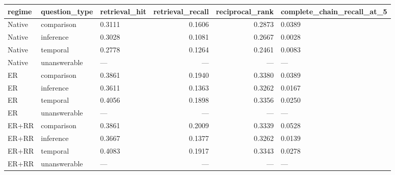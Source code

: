\begin{tabular}{lllrrl}
\toprule
regime & question_type & retrieval_hit & retrieval_recall & reciprocal_rank & complete_chain_recall_at_5 \\
\midrule
Native & comparison & 0.3111 & 0.1606 & 0.2873 & 0.0389 \\
Native & inference & 0.3028 & 0.1081 & 0.2667 & 0.0028 \\
Native & temporal & 0.2778 & 0.1264 & 0.2461 & 0.0083 \\
Native & unanswerable & — & — & — & — \\
ER & comparison & 0.3861 & 0.1940 & 0.3380 & 0.0389 \\
ER & inference & 0.3611 & 0.1363 & 0.3262 & 0.0167 \\
ER & temporal & 0.4056 & 0.1898 & 0.3356 & 0.0250 \\
ER & unanswerable & — & — & — & — \\
ER+RR & comparison & 0.3861 & 0.2009 & 0.3339 & 0.0528 \\
ER+RR & inference & 0.3667 & 0.1377 & 0.3262 & 0.0139 \\
ER+RR & temporal & 0.4083 & 0.1917 & 0.3343 & 0.0278 \\
ER+RR & unanswerable & — & — & — & — \\
\bottomrule
\end{tabular}

